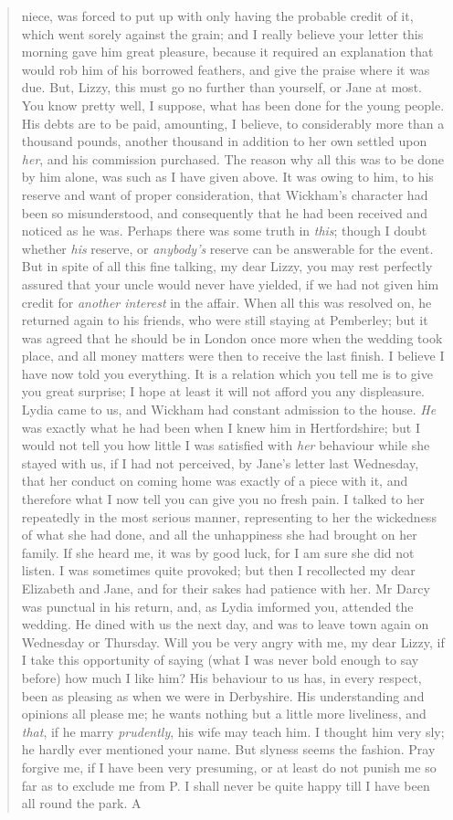 \begin{quotation}
niece, was forced to put up with only having the probable credit of it, which went sorely against the grain; and I really believe your letter this morning gave him great pleasure, because it required an explanation that would rob him of his borrowed feathers, and give the praise where it was due. But, Lizzy, this must go no further than yourself, or Jane at most. You know pretty well, I suppose, what has been done for the young people. His debts are to be paid, amounting, I believe, to considerably more than a thousand pounds, another thousand in addition to her own settled upon \textit{her}, and his commission purchased. The reason why all this was to be done by him alone, was such as I have given above. It was owing to him, to his reserve and want of proper consideration, that Wickham's character had been so misunderstood, and consequently that he had been received and noticed as he was. Perhaps there was some truth in \textit{this}; though I doubt whether \textit{his} reserve, or \textit{anybody's} reserve can be answerable for the event. But in spite of all this fine talking, my dear Lizzy, you may rest perfectly assured that your uncle would never have yielded, if we had not given him credit for \textit{another interest} in the affair. When all this was resolved on, he returned again to his friends, who were still staying at Pemberley; but it was agreed that he should be in London once more when the wedding took place, and all money matters were then to receive the last finish. I believe I have now told you everything. It is a relation which you tell me is to give you great surprise; I hope at least it will not afford you any displeasure. Lydia came to us, and Wickham had constant admission to the house. \textit{He} was exactly what he had been when I knew him in Hertfordshire; but I would not tell you how little I was satisfied with \textit{her} behaviour while she stayed with us, if I had not perceived, by Jane's letter last Wednesday, that her conduct on coming home was exactly of a piece with it, and therefore what I now tell you can give you no fresh pain. I talked to her repeatedly in the most serious manner, representing to her the wickedness of what she had done, and all the unhappiness she had brought on her family. If she heard me, it was by good luck, for I am sure she did not listen. I was sometimes quite provoked; but then I recollected my dear Elizabeth and Jane, and for their sakes had patience with her. Mr Darcy was punctual in his return, and, as Lydia imformed you, attended the wedding. He dined with us the next day, and was to leave town again on Wednesday or Thursday. Will you be very angry with me, my dear Lizzy, if I take this opportunity of saying (what I was never bold enough to say before) how much I like him? His behaviour to us has, in every respect, been as pleasing as when we were in Derbyshire. His understanding and opinions all please me; he wants nothing but a little more liveliness, and \textit{that}, if he marry \textit{prudently}, his wife may teach him. I thought him very sly; he hardly ever mentioned your name. But slyness seems the fashion. Pray forgive me, if I have been very presuming, or at least do not punish me so far as to exclude me from P. I shall never be quite happy till I have been all round the park. A 
\end{quotation}
